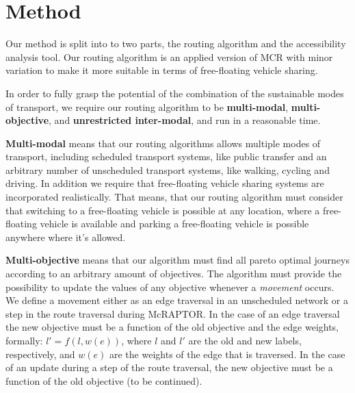 \clearpage
\section{Method}
\label{sec:method}

Our method is split into to two parts, the routing algorithm and the accessibility analysis tool.
Our routing algorithm is an applied version of MCR with minor variation to make it more suitable in terms of free-floating vehicle sharing.


In order to fully grasp the potential of the combination of the sustainable modes of transport, we require our routing algorithm to be \textbf{multi-modal}, \textbf{multi-objective}, and \textbf{unrestricted inter-modal}, and run in a reasonable time.

\textbf{Multi-modal} means that our routing algorithms allows multiple modes of transport, including scheduled transport systems, like public transfer and an arbitrary number of unscheduled transport systems, like walking, cycling and driving.
In addition we require that free-floating vehicle sharing systems are incorporated realistically.
That means, that our routing algorithm must consider that switching to a free-floating vehicle is possible at any location, where a free-floating vehicle is available and parking a free-floating vehicle is possible anywhere where it's allowed.

\textbf{Multi-objective} means that our algorithm must find all pareto optimal journeys according to an arbitrary amount of objectives.
The algorithm must provide the possibility to update the values of any objective whenever a \textit{movement} occurs.
We define a movement either as an edge traversal in an unscheduled network or a step in the route traversal during McRAPTOR.
In the case of an edge traversal the new objective must be a function of the old objective and the edge weights, formally: \(l' = f(l, w(e))\), where \(l\) and \(l'\) are the old and new labels, respectively, and \(w(e)\) are the weights of the edge that is traversed.
In the case of an update during a step of the route traversal, the new objective must be a function of the old objective (to be continued).

